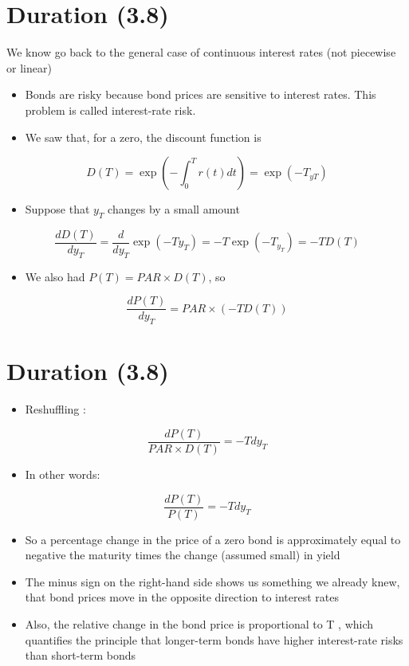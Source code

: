\documentclass[letterpaper]{article}
\begin{document}
\section*{Duration (3.8)}
We know go back to the general case of continuous interest rates (not piecewise or linear)

\begin{itemize}
  \item Bonds are risky because bond prices are sensitive to interest rates. This problem is called interest-rate risk.
  \item We saw that, for a zero, the discount function is
\end{itemize}

$$
D(T)=\exp \left(-\int_{0}^{T} r(t) d t\right)=\exp \left(-T_{y T}\right)
$$

\begin{itemize}
  \item Suppose that $y_{T}$ changes by a small amount
\end{itemize}

$$
\frac{d D(T)}{d y_{T}}=\frac{d}{d y_{T}} \exp \left(-T y_{T}\right)=-T \exp \left(-T_{y_{T}}\right)=-T D(T)
$$

\begin{itemize}
  \item We also had $P(T)=P A R \times D(T)$, so
\end{itemize}

$$
\frac{d P(T)}{d y_{T}}=P A R \times(-T D(T))
$$

\section*{Duration (3.8)}
\begin{itemize}
  \item Reshuffling :
\end{itemize}

$$
\frac{d P(T)}{P A R \times D(T)}=-T d y_{T}
$$

\begin{itemize}
  \item In other words:
\end{itemize}

$$
\frac{d P(T)}{P(T)}=-T d y_{T}
$$

\begin{itemize}
  \item So a percentage change in the price of a zero bond is approximately equal to negative the maturity times the change (assumed small) in yield
  \item The minus sign on the right-hand side shows us something we already knew, that bond prices move in the opposite direction to interest rates
  \item Also, the relative change in the bond price is proportional to T , which quantifies the principle that longer-term bonds have higher interest-rate risks than short-term bonds
\end{itemize}
\end{document}
